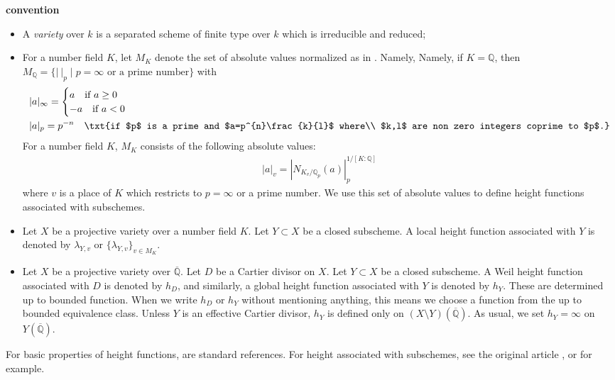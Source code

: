 \documentclass[12pt]{amsart}
\theoremstyle{plain}
\theoremstyle{definition}
\numberwithin{equation}{section}
\def\Q{{\mathbb Q}}
\def\QQ{\overline{\mathbb Q}}
\renewcommand{\l}{\lambda}
\begin{document}
\noindent
{\bf convention}
\begin{itemize}
\item A  \emph{variety} over $k$ is a separated scheme of finite type over $k$ which is irreducible and reduced;
\item
For a number field $K$, let $M_{K}$ denote the set of absolute values normalized as in \cite[p11 (1.6)]{BG06}.
Namely, Namely, if $K=\Q$, then $M_{\Q}=\{|\ |_{p} \mid \text{$p=\infty$ or a prime number} \}$ with
\begin{align}
 &|a|_{\infty} =
 \begin{cases}
 a \quad \text{if $a\geq0$}\\
 -a \quad \text{if $a<0$}
 \end{cases}
 \\
 & |a|_{p} = p^{-n} \quad \txt{if $p$ is a prime and  $a=p^{n}\frac{k}{l}$ where\\ $k,l$ are non zero integers coprime to $p$.}
\end{align}
For a number field $K$, $M_{K}$ consists of the following absolute values:
\begin{align}
|a|_{v} = |N_{K_{v}/\Q_{p}}(a)|_{p}^{1/[K:\Q]} 
\end{align}
where $v$ is a place of $K$ which restricts to $p = \infty$ or a prime number.
We use this set of absolute values to define height functions associated with subschemes.

\item
Let $X$ be a projective variety over a number field $K$.
Let $Y \subset X$ be a closed subscheme.
A local height function associated with $Y$ is denoted by $\l_{Y,v}$ or $\{ \l_{Y,v}\}_{v \in M_{K}}$.

\item
Let $X$ be a projective variety over $\QQ$.
Let $D$ be a Cartier divisor on $X$.
Let $Y \subset X$ be a closed subscheme.
A Weil height function associated with $D$ is denoted by $h_{D}$,
and similarly, a global height function associated with $Y$ is denoted by $h_{Y}$.
These are determined up to bounded function. When we write $h_{D}$ or $h_{Y}$
without mentioning anything, this means we choose a function from the up to bounded equivalence class. 
Unless $Y$ is an effective Cartier divisor, $h_{Y}$ is defined only on $(X \setminus Y)(\QQ)$.
As usual, we set $h_{Y}= \infty$ on $Y(\QQ)$.



\end{itemize}
For basic properties of height functions, \cite{BG06,HS00,La83} are standard references.
For height associated with subschemes, see the original article \cite{Sil87subht}, or \cite{matsuzawa2020height} for example.
\end{document}
